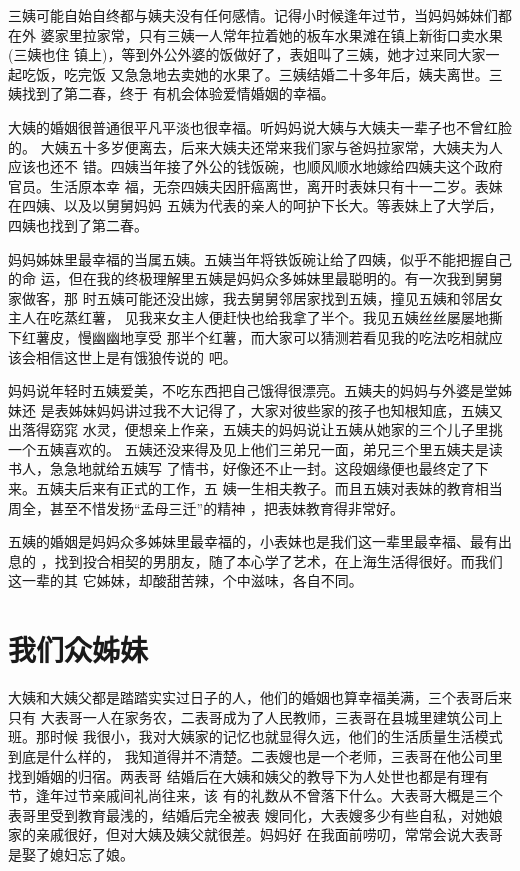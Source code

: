 \documentclass[12pt]{book}
\begin{document}
三姨可能自始自终都与姨夫没有任何感情。记得小时候逢年过节，当妈妈姊妹们都在外
婆家里拉家常，只有三姨一人常年拉着她的板车水果滩在镇上新街口卖水果(三姨也住
镇上)，等到外公外婆的饭做好了，表姐叫了三姨，她才过来同大家一起吃饭，吃完饭
又急急地去卖她的水果了。三姨结婚二十多年后，姨夫离世。三姨找到了第二春，终于
有机会体验爱情婚姻的幸福。

大姨的婚姻很普通很平凡平淡也很幸福。听妈妈说大姨与大姨夫一辈子也不曾红脸的。
大姨五十多岁便离去，后来大姨夫还常来我们家与爸妈拉家常，大姨夫为人应该也还不
错。四姨当年接了外公的钱饭碗，也顺风顺水地嫁给四姨夫这个政府官员。生活原本幸
福，无奈四姨夫因肝癌离世，离开时表妹只有十一二岁。表妹在四姨、以及以舅舅妈妈
五姨为代表的亲人的呵护下长大。等表妹上了大学后，四姨也找到了第二春。

妈妈姊妹里最幸福的当属五姨。五姨当年将铁饭碗让给了四姨，似乎不能把握自己的命
运，但在我的终极理解里五姨是妈妈众多姊妹里最聪明的。有一次我到舅舅家做客，那
时五姨可能还没出嫁，我去舅舅邻居家找到五姨，撞见五姨和邻居女主人在吃蒸红薯，
见我来女主人便赶快也给我拿了半个。我见五姨丝丝屡屡地撕下红薯皮，慢幽幽地享受
那半个红薯，而大家可以猜测若看见我的吃法吃相就应该会相信这世上是有饿狼传说的
吧。

妈妈说年轻时五姨爱美，不吃东西把自己饿得很漂亮。五姨夫的妈妈与外婆是堂姊妹还
是表姊妹妈妈讲过我不大记得了，大家对彼些家的孩子也知根知底，五姨又出落得窈窕
水灵，便想亲上作亲，五姨夫的妈妈说让五姨从她家的三个儿子里挑一个五姨喜欢的。
五姨还没来得及见上他们三弟兄一面，弟兄三个里五姨夫是读书人，急急地就给五姨写
了情书，好像还不止一封。这段姻缘便也最终定了下来。五姨夫后来有正式的工作，五
姨一生相夫教子。而且五姨对表妹的教育相当周全，甚至不惜发扬“孟母三迁”的精神
，把表妹教育得非常好。

五姨的婚姻是妈妈众多姊妹里最幸福的，小表妹也是我们这一辈里最幸福、最有出息的
，找到投合相契的男朋友，随了本心学了艺术，在上海生活得很好。而我们这一辈的其
它姊妹，却酸甜苦辣，个中滋味，各自不同。
\section{我们众姊妹}
\label{sec-9-19}

大姨和大姨父都是踏踏实实过日子的人，他们的婚姻也算幸福美满，三个表哥后来只有
大表哥一人在家务农，二表哥成为了人民教师，三表哥在县城里建筑公司上班。那时候
我很小，我对大姨家的记忆也就显得久远，他们的生活质量生活模式到底是什么样的，
我知道得并不清楚。二表嫂也是一个老师，三表哥在他公司里找到婚姻的归宿。两表哥
结婚后在大姨和姨父的教导下为人处世也都是有理有节，逢年过节亲戚间礼尚往来，该
有的礼数从不曾落下什么。大表哥大概是三个表哥里受到教育最浅的，结婚后完全被表
嫂同化，大表嫂多少有些自私，对她娘家的亲戚很好，但对大姨及姨父就很差。妈妈好
在我面前唠叨，常常会说大表哥是娶了媳妇忘了娘。
\end{document}
